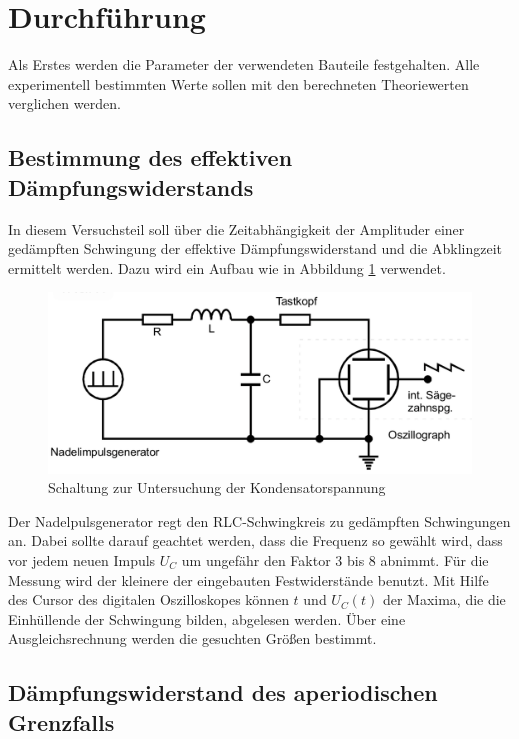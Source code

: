 \section{Durchführung}
\label{sec:Durchführung}

Als Erstes werden die Parameter der verwendeten Bauteile festgehalten.
Alle experimentell bestimmten Werte sollen mit den berechneten Theoriewerten verglichen werden.

\subsection{Bestimmung des effektiven Dämpfungswiderstands}
\label{sec:AufgabeA}

In diesem Versuchsteil soll über die Zeitabhängigkeit der Amplituder einer gedämpften Schwingung der effektive Dämpfungswiderstand und die Abklingzeit ermittelt werden.
Dazu wird ein Aufbau wie in Abbildung \ref{fig:abb5} verwendet.
\begin{figure}
  \centering
  \includegraphics[width=\textwidth]{abb5.jpg}
  \caption{Schaltung zur Untersuchung der Kondensatorspannung\cite{manualV354}}
  \label{fig:abb5}
\end{figure}
Der Nadelpulsgenerator regt den RLC-Schwingkreis zu gedämpften Schwingungen an.
Dabei sollte darauf geachtet werden, dass die Frequenz so gewählt wird, dass vor jedem neuen Impuls $U_C$ um ungefähr den Faktor 3 bis 8 abnimmt.
Für die Messung wird der kleinere der eingebauten Festwiderstände benutzt.
Mit Hilfe des Cursor des digitalen Oszilloskopes können $t$ und $U_C(t)$ der Maxima, die die Einhüllende der Schwingung bilden, abgelesen werden.
Über eine Ausgleichsrechnung werden die gesuchten Größen bestimmt.

\subsection{Dämpfungswiderstand des aperiodischen Grenzfalls}
\label{sec:AufgabeB}

